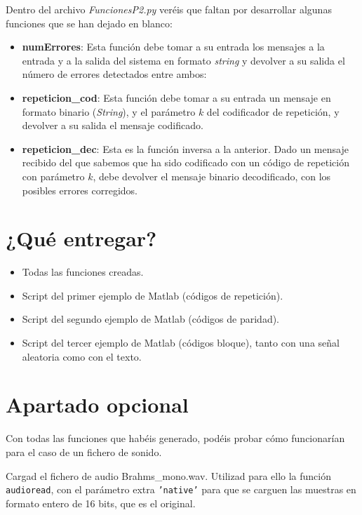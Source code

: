 \documentclass[es,practica]{uah}
\begin{document}
Dentro del archivo \emph{FuncionesP2.py} veréis que faltan por desarrollar algunas funciones que se han dejado en blanco:
\begin{itemize}
	\item {\bf numErrores}: Esta función debe tomar a su entrada los mensajes a la entrada y a la salida del sistema en formato \emph{string} y devolver a su salida el número de errores detectados entre ambos:

	\item {\bf repeticion\_cod}: Esta función debe tomar a su entrada un mensaje en formato binario (\emph{String}), y el parámetro $k$ del codificador de repetición, y devolver a su salida el mensaje codificado. 

	\item {\bf repeticion\_dec}: Esta es la función inversa a la anterior. Dado un mensaje recibido del que sabemos que ha sido codificado con un código de repetición con parámetro $k$, debe devolver el mensaje binario decodificado, con los posibles errores corregidos. 
\end{itemize}







\section{¿Qué entregar?}
\begin{itemize}
	\item Todas las funciones creadas.
	\item Script del primer ejemplo de Matlab (códigos de repetición).
	\item Script del segundo ejemplo de Matlab (códigos de paridad).
	\item Script del tercer ejemplo de Matlab (códigos bloque), tanto con una señal aleatoria como con el texto.
\end{itemize}

\section{Apartado opcional}

Con todas las funciones que habéis generado, podéis probar cómo funcionarían para el caso de un fichero de sonido. 

Cargad el fichero de audio Brahms\_mono.wav. Utilizad para ello la función \texttt{audioread}, con el parámetro extra \texttt{'native'} para que se carguen las muestras en formato entero de 16 bits, que es el original.
\end{document}
